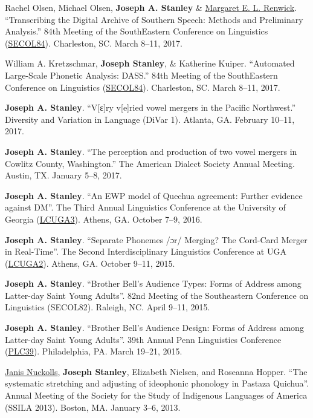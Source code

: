 \documentclass[
]{article}
\begin{document}
Rachel Olsen, Michael Olsen, \textbf{Joseph A. Stanley} \&
\href{http://faculty.franklin.uga.edu/mrenwick/}{Margaret E. L.
Renwick}. ``Transcribing the Digital Archive of Southern Speech: Methods
and Preliminary Analysis.'' 84th Meeting of the SouthEastern Conference
on Linguistics (\href{http://conf2017.secol.org}{SECOL84}). Charleston,
SC. March 8--11, 2017.

William A. Kretzschmar, \textbf{Joseph Stanley}, \& Katherine Kuiper.
``Automated Large-Scale Phonetic Analysis: DASS.'' 84th Meeting of the
SouthEastern Conference on Linguistics
(\href{http://conf2017.secol.org}{SECOL84}). Charleston, SC. March
8--11, 2017.

\textbf{Joseph A. Stanley}. ``V{[}ɛ{]}ry v{[}e{]}ried vowel mergers in
the Pacific Northwest.'' Diversity and Variation in Language (DiVar 1).
Atlanta, GA. February 10--11, 2017.

\textbf{Joseph A. Stanley}. ``The perception and production of two vowel
mergers in Cowlitz County, Washington.'' The American Dialect Society
Annual Meeting. Austin, TX. January 5--8, 2017.

\textbf{Joseph A. Stanley}. ``An EWP model of Quechua agreement: Further
evidence against DM''. The Third Annual Linguistics Conference at the
University of Georgia
(\href{https://www.linguistics.uga.edu/lcuga-3}{LCUGA3}). Athens, GA.
October 7--9, 2016.

\textbf{Joseph A. Stanley}. ``Separate Phonemes /ɔr/ Merging? The
Cord-Card Merger in Real-Time''. The Second Interdisciplinary
Linguistics Conference at UGA
(\href{https://www.linguistics.uga.edu/lcuga-2}{LCUGA2}). Athens, GA.
October 9--11, 2015.

\textbf{Joseph A. Stanley}. ``Brother Bell's Audience Types: Forms of
Address among Latter-day Saint Young Adults''. 82nd Meeting of the
Southeastern Conference on Linguistics (SECOL82). Raleigh, NC. April
9--11, 2015.

\textbf{Joseph A. Stanley}. ``Brother Bell's Audience Design: Forms of
Address among Latter-day Saint Young Adults''. 39th Annual Penn
Linguistics Conference
(\href{http://www.ling.upenn.edu/Events/PLC/plc39/}{PLC39}).
Philadelphia, PA. March 19--21, 2015.

\href{https://humanities.byu.edu/janis-nuckolls/}{Janis Nuckolls},
\textbf{Joseph Stanley}, Elizabeth Nielsen, and Roseanna Hopper. ``The
systematic stretching and adjusting of ideophonic phonology in Pastaza
Quichua''. Annual Meeting of the Society for the Study of Indigenous
Languages of America (SSILA 2013). Boston, MA. January 3--6, 2013.
\end{document}
